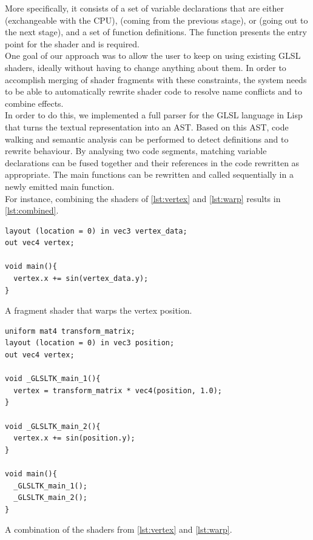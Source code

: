 \documentclass[format=sigconf]{acmart}
\begin{document}
More specifically, it consists of a set of variable declarations that are either  (exchangeable with the CPU),  (coming from the previous stage), or  (going out to the next stage), and a set of function definitions. The  function presents the entry point for the shader and is required. \\

One goal of our approach was to allow the user to keep on using existing GLSL shaders, ideally without having to change anything about them. In order to accomplish merging of shader fragments with these constraints, the system needs to be able to automatically rewrite shader code to resolve name conflicts and to combine effects. \\

In order to do this, we implemented a full parser for the GLSL language in Lisp that turns the textual representation into an AST. Based on this AST, code walking and semantic analysis can be performed to detect definitions and to rewrite behaviour. By analysing two code segments, matching variable declarations can be fused together and their references in the code rewritten as appropriate. The main functions can be rewritten and called sequentially in a newly emitted main function. \\

For instance, combining the shaders of \autoref{lst:vertex} and \autoref{lst:warp} results in \autoref{lst:combined}. \\

\begin{listing}[H]
\begin{verbatim}
layout (location = 0) in vec3 vertex_data;
out vec4 vertex;

void main(){
  vertex.x += sin(vertex_data.y);
}
\end{verbatim}
\caption{A fragment shader that warps the vertex position.}
\label{lst:warp}
\end{listing}

\begin{listing}[h]
\begin{verbatim}
uniform mat4 transform_matrix;
layout (location = 0) in vec3 position;
out vec4 vertex;

void _GLSLTK_main_1(){
  vertex = transform_matrix * vec4(position, 1.0);
}

void _GLSLTK_main_2(){
  vertex.x += sin(position.y);
}

void main(){
  _GLSLTK_main_1();
  _GLSLTK_main_2();
}
\end{verbatim}
\caption{A combination of the shaders from \autoref{lst:vertex} and \autoref{lst:warp}.}
\label{lst:combined}
\end{listing}
\end{document}
